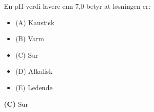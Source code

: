 

En pH-verdi lavere enn 7,0 betyr at løsningen er:

\begin{itemize}
\item{(A)} Kaustisk
\vskip 5pt 
\item{(B)} Varm
\vskip 5pt 
\item{(C)} Sur
\vskip 5pt 
\item{(D)} Alkalisk
\vskip 5pt 
\item{(E)} Ledende
\end{itemize}







{\bf (C)} Sur
 







